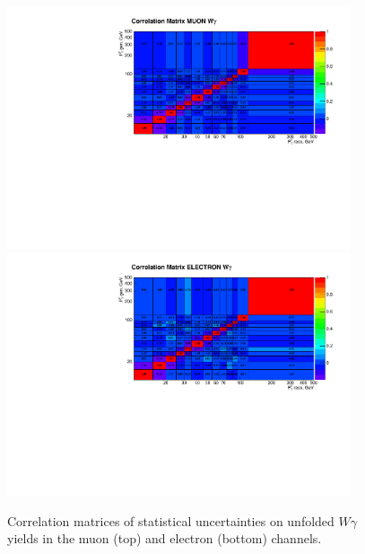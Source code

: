 \begin{figure}[htb]
  \begin{center}
   \includegraphics[width=0.90\textwidth]{../figs/figs_v11/MUON_WGamma/Constants/matrCorrelation_yield_pm_stat.pdf}\\
\includegraphics[width=0.90\textwidth]{../figs/figs_v11/ELECTRON_WGamma/Constants/matrCorrelation_yield_pm_stat.pdf}
  \caption{Correlation matrices of statistical uncertainties on unfolded $W\gamma$ yields in the muon (top) and electron (bottom) channels.}
  \label{fig:corrMatrices_Wg}
  \end{center}
\end{figure}

